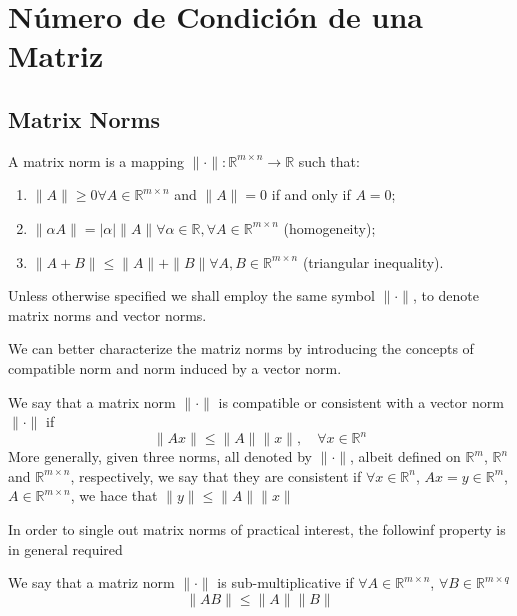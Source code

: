 \chapter{Número de Condición de una Matriz}
\section{Matrix Norms}
\begin{definition}
    A matrix norm is a mapping $\|\cdot\|: \mathbb{R}^{m \times n} \rightarrow \mathbb{R}$ such that:
    \begin{enumerate}
        \item $\|A\| \geq 0 \forall A \in \mathbb{R}^{m \times n}$ and $\|A\| = 0$ if and only if $A = 0$;
        \item $\|\alpha A\| = |\alpha| \|A\| \forall \alpha \in \mathbb{R}, \forall A \in \mathbb{R}^{m \times n}$ (homogeneity);
        \item $\| A + B\| \leq \|A\| + \|B\| \forall A, B \in \mathbb{R}^{m \times n}$ (triangular inequality).
    \end{enumerate}
\end{definition}

Unless otherwise specified we shall employ the same symbol $\|\cdot\|$, to denote matrix norms and vector norms.

We can better characterize the matriz norms by introducing the concepts of compatible norm and norm induced by a vector norm.

\begin{definition}
    We say that a matrix norm $\|\cdot\|$ is compatible or consistent with a vector norm $\|\cdot\|$ if 
    \begin{equation}
        \|Ax\| \leq \|A\| \|x\|, \quad \forall x \in \mathbb{R}^n
        \label{Eq: (1.16)}
    \end{equation}
    More generally, given three norms, all denoted by $\|\cdot\|$, albeit defined on $\mathbb{R}^m$, $\mathbb{R}^n$ and $\mathbb{R}^{m \times n}$, respectively, we say that they are consistent if $\forall x \in \mathbb{R}^n$, $Ax = y \in \mathbb{R}^m$, $A \in \mathbb{R}^{m \times n}$, we hace that $\|y\| \leq \|A\| \|x\|$
\end{definition}

In order to single out matrix norms of practical interest, the followinf property is in general required

\begin{definition}
    We say that a matriz norm $\| \cdot \|$ is sub-multiplicative if $\forall A \in \mathbb{R}^{m \times n}$, $\forall B \in \mathbb{R}^{m \times q}$
    \begin{equation}
        \| A B\| \leq \|A\| \|B\|
        \label{Eq: (1.17)}
    \end{equation}
\end{definition}

